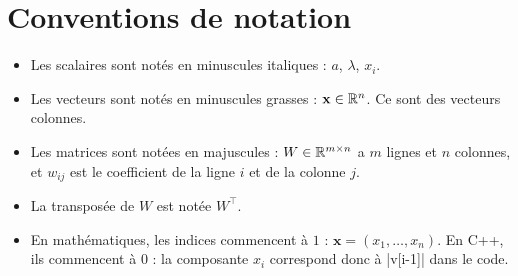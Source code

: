 \section{Conventions de notation}

\begin{itemize}
    \item Les scalaires sont notés en minuscules
          italiques : $a$, $\lambda$, $x_i$.
    \item Les vecteurs sont notés en minuscules
          grasses : $\mathbf{x} \in \mathbb{R}^n$. Ce sont
          des vecteurs colonnes.
    \item Les matrices sont notées en majuscules :
          $W \in \mathbb{R}^{m \times n}$ a $m$ lignes et
          $n$ colonnes, et $w_{ij}$ est le
          coefficient de la ligne $i$ et de la
          colonne $j$.
    \item La transposée de $W$ est notée $W^\top$.
    \item En mathématiques, les indices commencent
          à $1$ : $\mathbf{x} = (x_1, \dots, x_n)$.
          En C++, ils commencent à $0$ : la
          composante $x_i$ correspond donc à
          \cpp|v[i-1]| dans le code.
\end{itemize}


